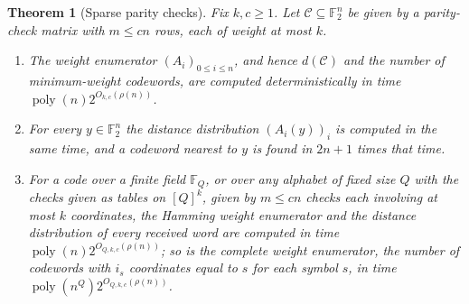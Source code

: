 \documentclass[11pt,reqno]{amsart}
\numberwithin{equation}{section}
\theoremstyle{plain}
\newtheorem{theorem}{Theorem}[section]
\theoremstyle{definition}
\theoremstyle{remark}
\DeclareMathOperator{\poly}{poly}
\newcommand{\Ftwo}{\mathbb{F}_2}
\newcommand{\rhon}{\rho}
\begin{document}
\begin{theorem}[Sparse parity checks]\label{thm:codes}
Fix $k,c\ge1$. Let $\mathcal C\subseteq\Ftwo^n$ be given by a parity-check matrix
with $m\le cn$ rows, each of weight at most $k$.
\begin{enumerate}[label=\textup{(\roman*)},leftmargin=2.2em]
\item\label{it:wenum} The weight enumerator $(A_i)_{0\le i\le n}$, and hence
$d(\mathcal C)$ and the number of minimum-weight codewords, are computed
deterministically in time $\poly(n)2^{O_{k,c}(\rhon(n))}$.
\item\label{it:coset} For every $y\in\Ftwo^n$ the distance distribution
$(A_i(y))_i$ is computed in the same time, and a codeword nearest to $y$ is
found in $2n+1$ times that time.
\item\label{it:qary} For a code over a finite field $\mathbb F_Q$, or over any
alphabet of fixed size $Q$ with the checks given as tables on $[Q]^{k}$, given by
$m\le cn$ checks each involving at most $k$ coordinates, the Hamming weight
enumerator and the distance distribution of every received word are computed
in time $\poly(n)2^{O_{Q,k,c}(\rhon(n))}$; so is the complete weight enumerator,
the number of codewords with $i_s$ coordinates equal to $s$ for each symbol
$s$, in time $\poly(n^{Q})2^{O_{Q,k,c}(\rhon(n))}$.
\end{enumerate}
\end{theorem}
\end{document}
